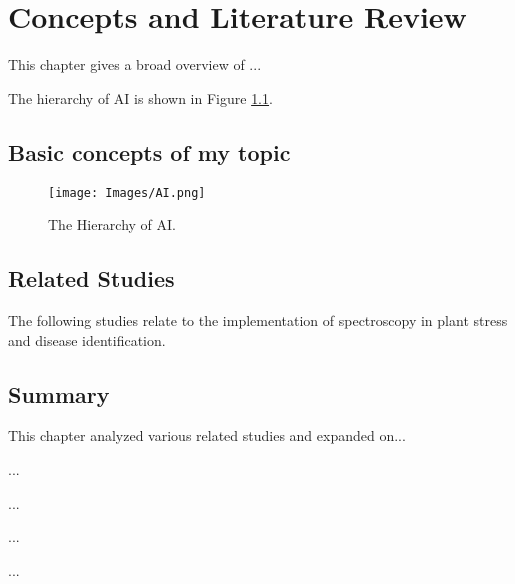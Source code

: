 
\chapter{Concepts and Literature Review}
\label{Chapter2}


    This chapter gives a broad overview of ...
    
    The hierarchy of AI is shown in Figure \ref{fig:ai}.

\section{Basic concepts of my topic}

    \begin{figure}[ht]
        \centering
        \texttt{[image: Images/AI.png]}
        \caption{The Hierarchy of AI.}
        \label{fig:ai}
    \end{figure}
    
\section{Related Studies}

    The following studies relate to the implementation of spectroscopy in plant stress and disease identification.
    



\section{Summary}\label{ch2Summary}

     This chapter analyzed various related studies and expanded on...
     
     ...
     
     ...
     
     
     ...
     
     ...

